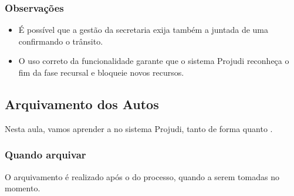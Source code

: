 \documentclass[letterpaper,10pt,brazil]{sphinxmanual}
\begin{document}
\subsubsection{Observações}
\label{\detokenize{projud_40_transitaremjulgado:observacoes}}\begin{itemize}
\item {} 
\sphinxAtStartPar
É possível que a gestão da secretaria exija também a juntada de uma  confirmando o trânsito.

\item {} 
\sphinxAtStartPar
O uso correto da funcionalidade garante que o sistema Projudi reconheça o fim da fase recursal e bloqueie novos recursos.

\end{itemize}

\sphinxstepscope


\subsection{Arquivamento dos Autos}
\label{\detokenize{projud_41_arquivamento:arquivamento-dos-autos}}\label{\detokenize{projud_41_arquivamento::doc}}
\sphinxAtStartPar
Nesta aula, vamos aprender a  no sistema Projudi, tanto de forma  quanto .


\subsubsection{Quando arquivar}
\label{\detokenize{projud_41_arquivamento:quando-arquivar}}
\sphinxAtStartPar
O arquivamento é realizado após o  do processo, quando  a serem tomadas no momento.
\end{document}
